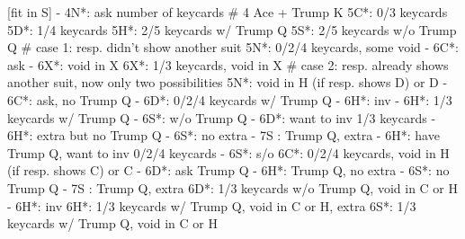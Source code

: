 [fit in S] - 4N*: ask number of keycards  # 4 Ace + Trump K
5C*: 0/3 keycards
5D*: 1/4 keycards
5H*: 2/5 keycards w/ Trump Q
5S*: 2/5 keycards w/o Trump Q
# case 1: resp. didn't show another suit
5N*: 0/2/4 keycards, some void
   - 6C*: ask
        - 6X*: void in X
6X*: 1/3 keycards, void in X
# case 2: resp. already shows another suit, now only two possibilities
5N*: void in H (if resp. shows D) or D
   - 6C*: ask, no Trump Q
        - 6D*: 0/2/4 keycards w/ Trump Q
             - 6H*: inv
        - 6H*: 1/3 keycards w/ Trump Q
        - 6S*: w/o Trump Q
   - 6D*: want to inv 1/3 keycards
        - 6H*: extra but no Trump Q
        - 6S*: no extra
        - 7S : Trump Q, extra
   - 6H*: have Trump Q, want to inv 0/2/4 keycards
   - 6S*: s/o
6C*: 0/2/4 keycards, void in H (if resp. shows C) or C
   - 6D*: ask Trump Q
        - 6H*: Trump Q, no extra
        - 6S*: no Trump Q
        - 7S : Trump Q, extra
6D*: 1/3 keycards w/o Trump Q, void in C or H
   - 6H*: inv
6H*: 1/3 keycards w/ Trump Q, void in C or H, extra
6S*: 1/3 keycards w/ Trump Q, void in C or H
